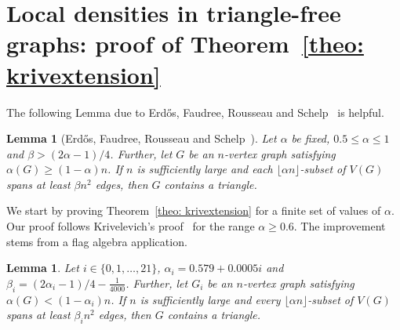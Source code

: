 \documentclass[11pt]{article}
\newtheorem{lemma}[theo]{Lemma}
\theoremstyle{definition}
\numberwithin{theo}{section}
\begin{document}
\section{Local densities in triangle-free graphs: proof of Theorem~\ref{theo: krivextension}}
\label{sec:KrivextensionK3}
The following Lemma due to Erd\H{o}s, Faudree, Rousseau and Schelp~\cite{MR1273598} is helpful.
\begin{lemma}[Erd\H{o}s, Faudree, Rousseau and Schelp~\cite{MR1273598}]
\label{lem: indseterdos}
Let $\alpha$ be fixed, $0.5\leq\alpha\leq 1$ and $\beta>(2\alpha-1)/4$. Further, let $G$ be an $n$-vertex graph satisfying $\alpha(G)\geq (1-\alpha)n$. If $n$ is sufficiently large and each $\lfloor \alpha n\rfloor$-subset of $V(G)$ spans at least $\beta n^2$ edges, then $G$ contains a triangle.
\end{lemma}
We start by proving Theorem~\ref{theo: krivextension} for a finite set of values of $\alpha$. Our proof follows Krivelevich's proof~\cite{MR1320169} for the range $\alpha\geq 0.6$. The improvement stems from a flag algebra application.  
\begin{lemma}
\label{lem: krivextendisc}
Let $i\in\{0,1,\ldots,21\}$, $\alpha_i=0.579+0.0005i$ and $\beta_i=(2\alpha_i-1)/4-\frac{1}{4000}$. Further, let $G_i$ be an $n$-vertex graph satisfying $\alpha(G)< (1-\alpha_i)n$. If $n$ is sufficiently large and every $\lfloor \alpha n\rfloor$-subset of $V(G)$ spans at least $\beta_i n^2$ edges, then $G$ contains a triangle.
\end{lemma}
\end{document}
